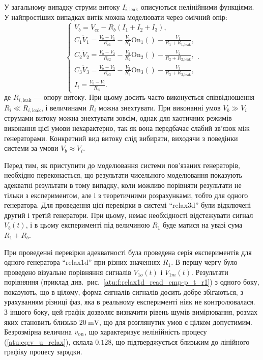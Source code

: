 У загальному випадку струми витоку
$I_{i, \mathrm{leak}} $ описуються нелінійними функціями. У найпростіших
випадках витік можна моделювати через омічний опір:
%
\begin{equation}
  \begin{cases}
    V_b = V_{cc} - R_b ( I_1 + I_2 + I_3 ), \\
      C_1 \dot{V}_1 = \frac{V_b-V_1}{R_{v1}} - \frac{V_1}{R_1} \mathrm{On}_1() - \frac{V_1}{R_1+R_{1,\mathrm{leak}}}, \\
      C_2 \dot{V}_2 = \frac{V_b-V_2}{R_{v2}} - \frac{V_2}{R_2} \mathrm{On}_2() - \frac{V_2}{R_2+R_{2,\mathrm{leak}}}, \\
      C_3 \dot{V}_3 = \frac{V_b-V_3}{R_{v3}} - \frac{V_3}{R_3} \mathrm{On}_3() - \frac{V_3}{R_3+R_{3,\mathrm{leak}}}, \\
      I_i = \frac{V_b-V_i}{R_{vi}}.
  \end{cases}.
    \label{atu:eq:relax3_linleak}
\end{equation}
%
де
$R_{i, \mathrm{leak}} $ --- опору витоку. При цьому досить часто виконується
співвідношення
$R_{i} \ll R_{i, \mathrm{leak}} $, і величинами
$R_{i} $ можна знехтувати. При виконанні умов
$V_b \gg V_i $ струмами витоку можна знехтувати зовсім, однак для
хаотичних режимів виконання цієї умови нехарактерно, так як
вона передбачає слабий зв'язок між генераторами. Конкретний
вид витоку слід вибирати, виходячи з поведінки системи за умови
$V_b \approx V_i $.

Перед тим, як приступити до моделювання системи пов'язаних
генераторів, необхідно переконається, що результати
чисельного моделювання показують адекватні результати в
тому випадку, коли можливо порівняти результати не тільки з
експериментом, але і з теоретичними розрахунками, тобто для
одного генератора. Для проведення цієї перевірки в системі
``relax3d'' були відключені другий і третій генератори. При цьому,
немає необхідності відстежувати сигнал
$V_b (t) $, і в цьому експерименті під величиною
$R_1 $ буде матися на увазі сума
$R_1 + R_b $.

При проведенні перевірки адекватності була проведена серія
експериментів для одного генератора ``relax1d'' при різних значеннях
$R_1$. В першу чергу було проведено візуальне порівняння сигналів
$V_{1o}(t)$ і
$V_{1m}(t)$. Результати порівняння (приклад
див.~рис.~\ref{atu:f:relax1d_read_cmp-p_t_r1}) з одного боку, показують, що в
цілому, форма сигналів сигналів досить добре збігаються, з
урахуванням різниці фаз, яка в реальному експерименті ніяк не
контролювалася. З іншого боку, цей графік дозволяє визначити
рівень шумів вимірювання, розмах яких становить близько
$\SI{20}{\milli \volt} $, що для розглянутих умов є цілком
допустимим. Безрозмірна величина
$v _\mathrm{on} $, що характеризує нелінійність процесу (\ref{atu:eq:v_u_relax}),
склала
$0.128 $, що підтверджується близьким до лінійного графіку процесу
зарядки.




